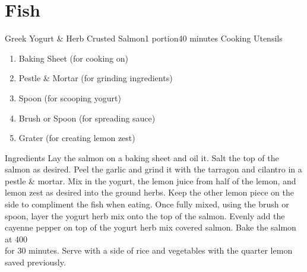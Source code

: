 \documentclass[12pt]{book}
\begin{document}
\maketitle
\begin{minipage}{\textwidth}
\vfill
\tableofcontents
\end{minipage}

\chapter{Fish}
\newpage

\begin{recipe}{Greek Yogurt \& Herb Crusted Salmon}{1 portion}{40 minutes}
\freeform Cooking Utensils
\begin{enumerate}[label=\theenumi, topsep=2pt, itemsep=-1ex, leftmargin=20ex, labelsep=19ex]
	\item Baking Sheet (for cooking on)
	\item Pestle \& Mortar (for grinding ingredients)
	\item Spoon (for scooping yogurt)
	\item Brush or Spoon (for spreading sauce)
	\item Grater (for creating lemon zest)
\end{enumerate}
\vspace{0.1cm}

\freeform Ingredients
Lay the salmon on a baking sheet and oil it. Salt the top of the salmon as desired.
Peel the garlic and grind it with the tarragon and cilantro in a pestle \& mortar.
Mix in the yogurt, the lemon juice from half of the lemon, and lemon zest as desired into the ground herbs. Keep the other lemon piece on the side to compliment the fish when eating. Once fully mixed, using the brush or spoon, layer the yogurt herb mix onto the top of the salmon.
Evenly add the cayenne pepper on top of the yogurt herb mix covered salmon. Bake the salmon at 400\degree \\for 30 minutes. Serve with a side of rice and vegetables with the quarter lemon saved previously.
\end{recipe}
\end{document}
